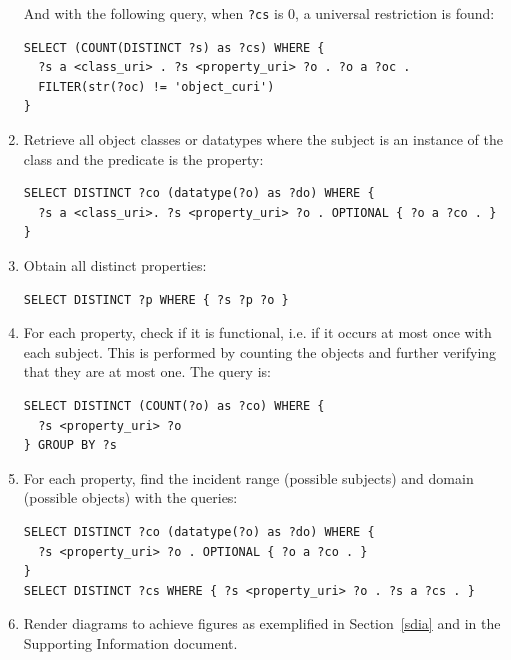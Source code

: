 \documentclass[data,datadescriptor,submit,moreauthors,pdftex]{Definitions/mdpi}
\newcommand{\te}[1] {\texttt{\footnotesize#1}}
\begin{document}
\begin{enumerate}
        And with the following query, when \te{?cs} is 0, a universal restriction is found:
\begin{lstlisting}[language=spq]
SELECT (COUNT(DISTINCT ?s) as ?cs) WHERE {
  ?s a <class_uri> . ?s <property_uri> ?o . ?o a ?oc .
  FILTER(str(?oc) != 'object_curi')
}
\end{lstlisting}
  \item Retrieve all object classes or datatypes where the subject is an instance of the class and the predicate is the property:
\begin{lstlisting}[language=spq]
SELECT DISTINCT ?co (datatype(?o) as ?do) WHERE {
  ?s a <class_uri>. ?s <property_uri> ?o . OPTIONAL { ?o a ?co . }
}
\end{lstlisting}
  \item Obtain all distinct properties:
\begin{lstlisting}[language=spq]
SELECT DISTINCT ?p WHERE { ?s ?p ?o }
\end{lstlisting}
  \item For each property, check if it is functional, i.e. if it
        occurs at most once with each subject.
        This is performed by counting the objects and further verifying
        that they are at most one. The query is:
\begin{lstlisting}[language=spq]
SELECT DISTINCT (COUNT(?o) as ?co) WHERE {
  ?s <property_uri> ?o 
} GROUP BY ?s
\end{lstlisting}
  \item For each property, find the incident range (possible subjects) and domain (possible objects) with the
        queries:
\begin{lstlisting}[language=spq]
SELECT DISTINCT ?co (datatype(?o) as ?do) WHERE {
  ?s <property_uri> ?o . OPTIONAL { ?o a ?co . }
} 
SELECT DISTINCT ?cs WHERE { ?s <property_uri> ?o . ?s a ?cs . }
\end{lstlisting}
  \item Render diagrams to achieve figures as exemplified in Section~\ref{sdia} and in the Supporting Information document.
\end{enumerate}
\end{document}
